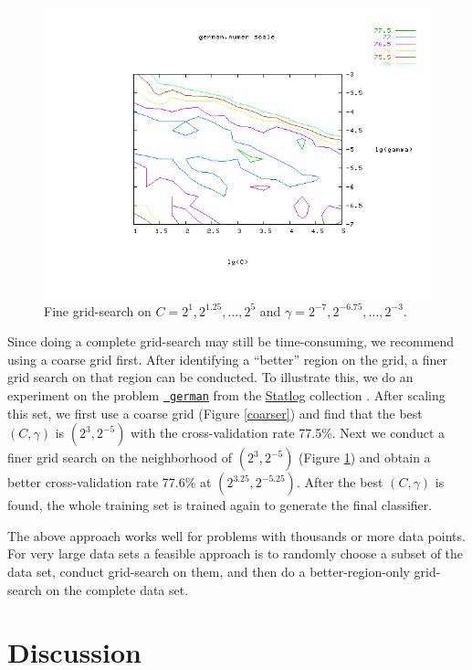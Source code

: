 \documentclass[12pt]{article}
\begin{document}
\begin{figure}[t!]
\begin{center}
\includegraphics[width=0.75\linewidth,viewport=145 55 625 450,clip]{finer.png}
\end{center}
\caption{Fine grid-search on $C=2^{1},2^{1.25},\ldots,2^{5}$ and 
$\gamma=2^{-7},2^{-6.75},\ldots,2^{-3}.$}
\label{finer}
\end{figure}

Since doing a complete grid-search may still be time-consuming, we
recommend using a coarse grid first.  After identifying a ``better''
region on the grid, a finer grid search on that region can be
conducted. To illustrate this, we do an experiment on the problem
\href{http://www.csie.ntu.edu.tw/~cjlin/libsvmtools/binary/german.numer_scale}{{\tt
    german}} from the
\href{http://www.ncc.up.pt/liacc/ML/statlog/datasets.html}{Statlog}
collection \citep{DM94a}. After scaling this set, we first use a
coarse grid (Figure \ref{coarser}) and find that the best $(C,
\gamma)$ is $(2^3, 2^{-5})$ with the cross-validation rate 77.5\%.
Next we conduct a finer grid search on the neighborhood of $(2^3,
2^{-5})$ (Figure \ref{finer}) and obtain a better cross-validation
rate 77.6\% at $(2^{3.25}, 2^{-5.25})$. After the best $(C, \gamma)$
is found, the whole training set is trained again to generate the
final classifier.

The above approach works well for problems with thousands or more data
points. For very large data sets a feasible approach is to randomly
choose a subset of the data set, conduct grid-search on them, and then
do a better-region-only grid-search on the complete data set.

\section{Discussion}
\end{document}
